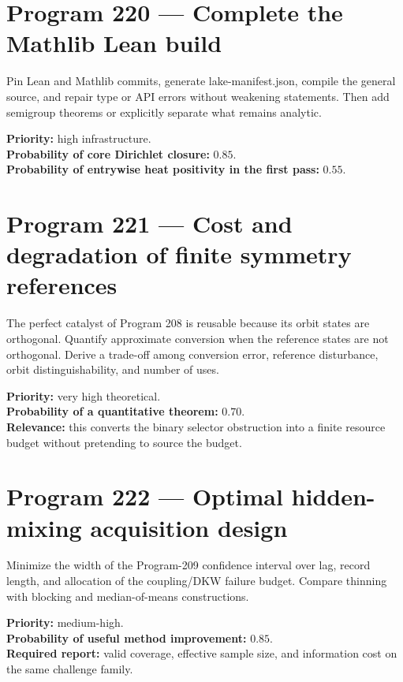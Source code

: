 \documentclass[11pt,a4paper,openany]{report}
\begin{document}
\section{Program 220 --- Complete the Mathlib Lean build}

Pin Lean and Mathlib commits, generate lake-manifest.json, compile the general source, and repair type or API errors without weakening statements. Then add semigroup theorems or explicitly separate what remains analytic.

\textbf{Priority:} high infrastructure.\\
\textbf{Probability of core Dirichlet closure:} \(0.85\).\\
\textbf{Probability of entrywise heat positivity in the first pass:} \(0.55\).

\section{Program 221 --- Cost and degradation of finite symmetry references}

The perfect catalyst of Program 208 is reusable because its orbit states are orthogonal. Quantify approximate conversion when the reference states are not orthogonal. Derive a trade-off among conversion error, reference disturbance, orbit distinguishability, and number of uses.

\textbf{Priority:} very high theoretical.\\
\textbf{Probability of a quantitative theorem:} \(0.70\).\\
\textbf{Relevance:} this converts the binary selector obstruction into a finite resource budget without pretending to source the budget.

\section{Program 222 --- Optimal hidden-mixing acquisition design}

Minimize the width of the Program-209 confidence interval over lag, record length, and allocation of the coupling/\allowbreak{}DKW failure budget. Compare thinning with blocking and median-of-means constructions.

\textbf{Priority:} medium-high.\\
\textbf{Probability of useful method improvement:} \(0.85\).\\
\textbf{Required report:} valid coverage, effective sample size, and information cost on the same challenge family.
\end{document}
